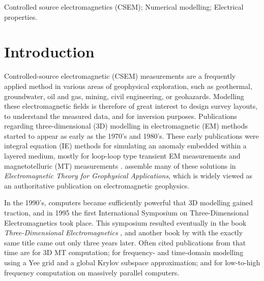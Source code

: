 \documentclass[onecolumn,extra,camera]{gji}
\begin{document}
\begin{keywords}
  Controlled source electromagnetics (CSEM); Numerical modelling; Electrical
  properties.
\end{keywords}


\section{Introduction}

Controlled-source electromagnetic (CSEM) measurements are a frequently applied method in various areas of geophysical exploration, such as geothermal, groundwater, oil and gas, mining, civil engineering, or geohazards. Modelling these electromagnetic fields is therefore of great interest to design survey layouts, to understand the measured data, and for inversion purposes. Publications regarding three-dimensional (3D) modelling in electromagnetic (EM) methods started to appear as early as the 1970's and 1980's. These early publications were integral equation (IE) methods for simulating an anomaly embedded within a layered medium, mostly for loop-loop type transient EM measurements  \citep{GJI.74.Raiche, GEO.75.Hohmann, GJI.82.Das, GEO.86.Newman} and magnetotelluric (MT) measurements \citep{GEO.84.Wannamaker}. \cite{B.SEG.88.Ward} assemble many of these solutions in \emph{Electromagnetic Theory for Geophysical Applications}, which is widely viewed as an authoritative publication on electromagnetic geophysics.

In the 1990's, computers became sufficiently powerful that 3D modelling gained traction, and in 1995 the first International Symposium on Three-Dimensional Electromagnetics took place. This symposium resulted eventually in the book \emph{Three-Dimensional Electromagnetics} \citep{B.SEG.99.Oristaglio}, and another book by \cite{B.02.Wannamaker} with the exactly same title came out only three years later. Often cited publications from that time are \cite{RSC.94.Mackie} for 3D MT computation; \cite{RS.94.Druskin} for frequency- and time-domain modelling using a Yee grid and a global Krylov subspace approximation; and \cite{RS.96.Alumbaugh, GJI.97.Newman} for low-to-high frequency computation on massively parallel computers.
\end{document}
